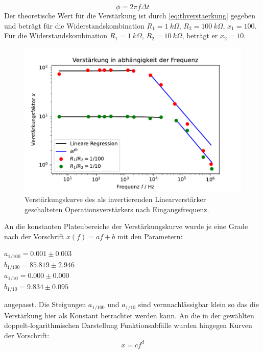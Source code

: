\begin{equation}
    \label{eq:phasenverschiebung}
    \phi=2\pi f \Delta t
\end{equation}
Der theoretische Wert für die Verstärkung ist durch \autoref{eq:thverstaerkung} gegeben und beträgt für
die Widerstandskombination $R_1=\SI[]{1}[]{k\Omega}$, $R_2=\SI[]{100}[]{k\Omega}$, $x_1=100$. Für die 
Widerstandskombination $R_1=\SI[]{1}[]{k\Omega}$, $R_2=\SI[]{10}[]{k\Omega}$, beträgt er $x_2=10$.
\begin{figure}
    \centering
    \includegraphics{content/grafiken/verstaerkung.pdf}
    \caption{Verstärkungskurve des als invertierenden Linearverstärker geschalteten Operationsverstärkers nach Eingangsfrequenz.}
    \label{fig:linearverstaerker}
  \end{figure}
  An die konstanten Plateubereiche der Verstärkungskurve wurde je eine Grade nach der Vorschrift $x(f)=af+b$ 
  mit den Parametern:
   \begin{center}
       $a_{1/100} =  0.001\pm 0.003$\\
       $b_{1/100} = 85.819\pm 2.946$\\
       $a_{1/10}  =  0.000\pm 0.000$\\
       $b_{1/10}  = 9.834 \pm 0.095$\\
   \end{center}
 angepasst. Die Steigungen $a_{1/100}$ und $a_{1/10}$ sind vernnachlässigbar klein so das die Verstärkung
 hier als Konstant betrachtet werden kann. An die in der gewählten doppelt-logarithmischen Darstellung
 Funktionsabfälle wurden hingegen Kurven der Vorschrift: 
 \begin{equation}
    \label{eq:exponentialgesetz}
    x=cf^d
 \end{equation}
